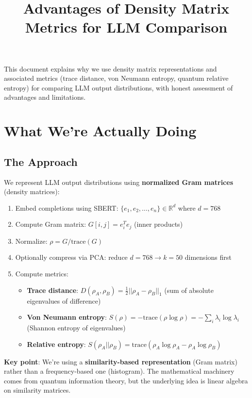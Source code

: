 \documentclass[11pt]{article}
\title{Advantages of Density Matrix Metrics for LLM Comparison}
\author{}
\date{}
\begin{document}
\maketitle

This document explains why we use density matrix representations and associated metrics (trace distance, von Neumann entropy, quantum relative entropy) for comparing LLM output distributions, with honest assessment of advantages and limitations.

\section{What We're Actually Doing}

\subsection{The Approach}

We represent LLM output distributions using \textbf{normalized Gram matrices} (density matrices):

\begin{enumerate}
\item Embed completions using SBERT: $\{e_1, e_2, \ldots, e_n\} \in \mathbb{R}^d$ where $d=768$
\item Compute Gram matrix: $G[i,j] = e_i^T e_j$ (inner products)
\item Normalize: $\rho = G / \text{trace}(G)$
\item Optionally compress via PCA: reduce $d=768 \to k=50$ dimensions first
\item Compute metrics:
\begin{itemize}
\item \textbf{Trace distance}: $D(\rho_A, \rho_B) = \frac{1}{2} ||\rho_A - \rho_B||_1$ (sum of absolute eigenvalues of difference)
\item \textbf{Von Neumann entropy}: $S(\rho) = -\text{trace}(\rho \log \rho) = -\sum_i \lambda_i \log \lambda_i$ (Shannon entropy of eigenvalues)
\item \textbf{Relative entropy}: $S(\rho_A || \rho_B) = \text{trace}(\rho_A \log \rho_A - \rho_A \log \rho_B)$
\end{itemize}
\end{enumerate}

\textbf{Key point}: We're using a \textbf{similarity-based representation} (Gram matrix) rather than a frequency-based one (histogram). The mathematical machinery comes from quantum information theory, but the underlying idea is linear algebra on similarity matrices.
\end{document}
